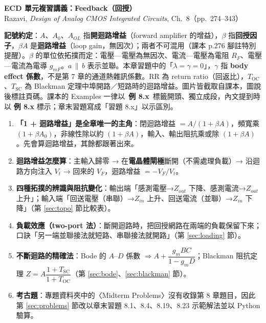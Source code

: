 \documentclass[11pt,a4paper]{article}
\newcommand{\pll}{\,\|\,}
\newcommand{\Tsc}{T_{\text{SC}}}
\newcommand{\Toc}{T_{\text{OC}}}
\newcommand{\extag}[1]{\colorbox{extagbg}{\textcolor{extag}{\sffamily\bfseries\,例 #1\,}}}
\newcommand{\exref}[1]{\textcolor{extag}{\textbf{\sffamily 例 #1}}}
\begin{document}
\begin{center}{\LARGE\bfseries\sffamily ECD 單元複習講義：Feedback（回授）}\\[0.3em]{\large Razavi, \emph{Design of Analog CMOS Integrated Circuits}, Ch.~8（pp.~274--343）}\end{center}

\textbf{記號約定}：$A$、$A_0$、$A_{OL}$ 指\textbf{開迴路增益}（forward amplifier 的增益），$\beta$ 指\textbf{回授因子}，$\beta A$ 是\textbf{迴路增益}（loop gain，無因次）；兩者不可混用（課本 p.276 腳註特別提醒）。$\beta$ 的單位依拓撲而定：電壓—電壓為無因次、電流—電壓為電阻 $R_F$、電壓—電流為電導 $g_{mF}$。$a\pll b$ 表示並聯。本章習題中的「$\lambda=\gamma=0$」，$\gamma$ 指 \textbf{body effect 係數}，不是第 7 章的通道熱雜訊係數。RR 為 return ratio（回返比），$\Toc$、$\Tsc$ 為 Blackman 定理中埠開路／短路時的迴路增益。圖片皆截取自課本，圖說後標註頁碼。課本的 Examples 一律以 \extag{8.x} 標籤開頭、獨立成段，內文提到時以 \exref{8.x} 標示；章末習題寫成「習題 8.x」以示區別。

\begin{takeaway}[考試重點地圖]
\begin{enumerate}[leftmargin=2.2em]
  \item \textbf{「1 + 迴路增益」是全章唯一的主角}：閉迴路增益 $=A/(1+\beta A)$，頻寬乘 $(1+\beta A_0)$，非線性除以約 $(1+\beta A)$，輸入、輸出阻抗乘或除 $(1+\beta A)$。先會算迴路增益，其餘都跟著出來。
  \item \textbf{迴路增益怎麼算}：主輸入歸零 → 在\textbf{電晶體閘極}斷開（不需處理負載）→ 沿迴路方向注入 $V_t$ → 回來的 $V_F$，迴路增益 $=-V_F/V_t$。
  \item \textbf{四種拓撲的辨識與阻抗變化}：輸出端「感測電壓→$Z_{out}$ 下降、感測電流→$Z_{out}$ 上升」；輸入端「回送電壓（串聯）→$Z_{in}$ 上升、回送電流（並聯）→$Z_{in}$ 下降」（第 \ref{sec:topo} 節比較表）。
  \item \textbf{負載效應（two-port 法）}：斷開迴路時，把回授網路在兩端的負載保留下來；口訣「另一端並聯接法就短路、串聯接法就開路」（第 \ref{sec:loading} 節）。
  \item \textbf{不斷迴路的精確法}：Bode 的 $A$–$D$ 係數 $\Rightarrow A+\dfrac{g_mBC}{1-g_mD}$；Blackman 阻抗定理 $Z=A\dfrac{1+\Tsc}{1+\Toc}$（第 \ref{sec:bode}、\ref{sec:blackman} 節）。
  \item \textbf{考古題}：專題資料夾中的〈Midterm Problems〉沒有收錄第 8 章題目，因此第 \ref{sec:problems} 節改以章末習題 8.1、8.4、8.19、8.23 示範解法並以 Python 驗算。
\end{enumerate}
\end{takeaway}
\end{document}
